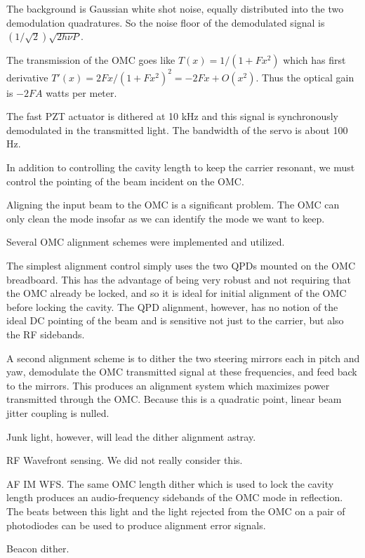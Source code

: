The background is Gaussian white shot noise, equally distributed into
the two demodulation quadratures.  So the noise floor of the
demodulated signal is $(1/\sqrt{2})\sqrt{2 h \nu P}$.

The transmission of the OMC goes like $T(x) = 1/\left(1 + Fx^2\right)$
which has first derivative $T'(x) = 2 F x / \left(1 + F x^2\right)^2 =
- 2 F x + O(x^2)$.  Thus the optical gain is $-2 F A$ watts per meter.

The fast PZT actuator is dithered at 10 kHz and this signal is
synchronously demodulated in the transmitted light.  The bandwidth of
the servo is about 100 Hz.


In addition to controlling the cavity length to keep the carrier
resonant, we must control the pointing of the beam incident on the
OMC.

Aligning the input beam to the OMC is a significant problem.  The OMC
can only clean the mode insofar as we can identify the mode we want to
keep.

Several OMC alignment schemes were implemented and utilized.

The simplest alignment control simply uses the two QPDs mounted on the
OMC breadboard.  This has the advantage of being very robust and not
requiring that the OMC already be locked, and so it is ideal for
initial alignment of the OMC before locking the cavity.  The QPD
alignment, however, has no notion of the ideal DC pointing of the beam
and is sensitive not just to the carrier, but also the RF sidebands.

A second alignment scheme is to dither the two steering mirrors each
in pitch and yaw, demodulate the OMC transmitted signal at these
frequencies, and feed back to the mirrors.  This produces an alignment
system which maximizes power transmitted through the OMC.  Because
this is a quadratic point, linear beam jitter coupling is nulled.

Junk light, however, will lead the dither alignment astray.

RF Wavefront sensing.  We did not really consider this.

AF IM WFS.  The same OMC length dither which is used to lock the cavity
length produces an audio-frequency sidebands of the OMC mode in
reflection.  The beats between this light and the light rejected from
the OMC on a pair of photodiodes can be used to produce alignment
error signals.

Beacon dither.  


